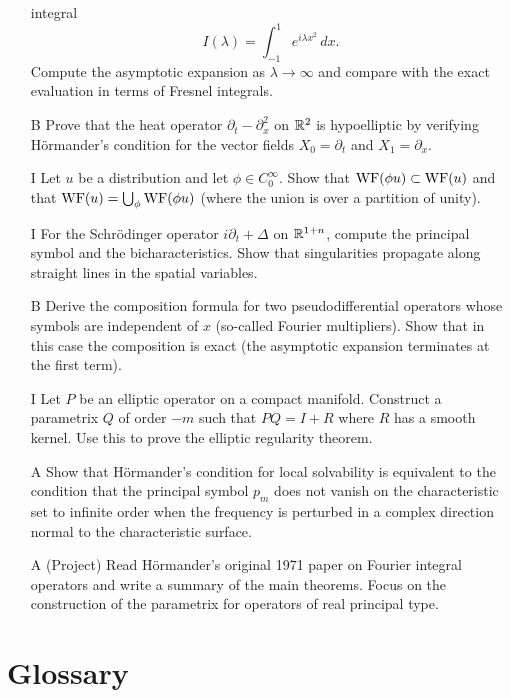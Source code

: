 \begin{enumerate}
    integral
    \[
    I(\lambda) = \int_{-1}^1 e^{i\lambda x^2} \,dx.
    \]
    Compute the asymptotic expansion as \(\lambda \to \infty\) and
    compare with the exact evaluation in terms of Fresnel integrals.
    \item [B] Prove that the heat operator \(\partial_t - \partial_x^2\)
    on \(\mathbb{R}^2\) is hypoelliptic by verifying H\"ormander's condition
    for the vector fields \(X_0 = \partial_t\) and \(X_1 = \partial_x\).
    \item [I] Let \(u\) be a distribution and let \(\phi \in C_0^\infty\).
    Show that \(\operatorname{WF}(\phi u) \subset \operatorname{WF}(u)\) and that
    \(\operatorname{WF}(u) = \bigcup_\phi \operatorname{WF}(\phi u)\) (where the union is over a
    partition of unity).
    \item [I] For the Schr\"odinger operator \(i\partial_t + \Delta\) on
    \(\mathbb{R}^{1+n}\), compute the principal symbol and the bicharacteristics.
    Show that singularities propagate along straight lines in the
    spatial variables.
    \item [B] Derive the composition formula for two pseudodifferential
    operators whose symbols are independent of \(x\) (so-called
    Fourier multipliers). Show that in this case the composition is
    exact (the asymptotic expansion terminates at the first term).
    \item [I] Let \(P\) be an elliptic operator on a compact manifold.
    Construct a parametrix \(Q\) of order \(-m\) such that
    \(P Q = I + R\) where \(R\) has a smooth kernel. Use this to prove
    the elliptic regularity theorem.
    \item [A] Show that H\"ormander's condition for local solvability is
    equivalent to the condition that the principal symbol \(p_m\)
    does not vanish on the characteristic set to infinite order when
    the frequency is perturbed in a complex direction normal to the
    characteristic surface.
    \item [A] (Project) Read H\"ormander's original 1971 paper on Fourier
    integral operators and write a summary of the main theorems. Focus
    on the construction of the parametrix for operators of real
    principal type.
\end{enumerate}

\section*{Glossary}

